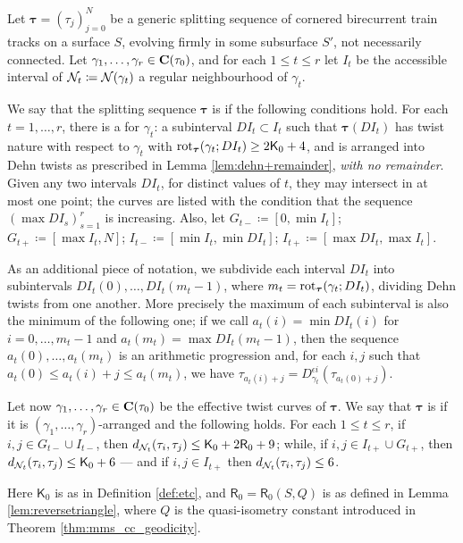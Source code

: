 \begin{defin}\label{def:arranged}
Let $\bm\tau=(\tau_j)_{j=0}^N$ be a generic splitting sequence of cornered birecurrent train tracks on a surface $S$, evolving firmly in some subsurface $S'$, not necessarily connected. Let $\gamma_1,\ldots,\gamma_r\in\mathbf C(\tau_0)$, and for each $1\leq t \leq r$ let $I_t$ be the accessible interval of ${\mathcal N}_t\coloneqq {\mathcal N}(\gamma_t)$ a regular neighbourhood of $\gamma_t$.

We say that the splitting sequence $\bm\tau$ is  if the following conditions hold. For each $t=1,\ldots,r$, there is a  for $\gamma_t$: a subinterval $DI_t\subset I_t$ such that $\bm\tau(DI_t)$ has twist nature with respect to $\gamma_t$ with $\mathrm{rot}_{\bm\tau}(\gamma_t;DI_t)\geq 2\mathsf{K}_0+4$, and is arranged into Dehn twists as prescribed in Lemma \ref{lem:dehn+remainder}, \emph{with no remainder}. Given any two intervals $DI_t$, for distinct values of $t$, they may intersect in at most one point; the curves are listed with the condition that the sequence $(\max DI_s)_{s=1}^r$ is increasing. Also, let $G_{t-}\coloneqq[0,\min I_t]$; $G_{t+}\coloneqq[\max I_t,N]$; $I_{t-}\coloneqq[\min I_t,\min DI_t]$; $I_{t+}\coloneqq [\max DI_t,\max I_t]$.

As an additional piece of notation, we subdivide each interval $DI_t$ into subintervals $DI_t(0), \ldots, DI_t(m_t-1)$, where $m_t=\mathrm{rot}_{\bm\tau}(\gamma_t;DI_t)$, dividing Dehn twists from one another. More precisely the maximum of each subinterval is also the minimum of the following one; if we call $a_t(i)=\min DI_t(i)$ for $i=0,\ldots,m_t-1$ and $a_t(m_t)=\max DI_t(m_t-1)$, then the sequence $a_t(0),\ldots,a_t(m_t)$ is an arithmetic progression and, for each $i,j$ such that $a_t(0) \leq a_t(i) +j \leq a_t(m_t)$, we have $\tau_{a_t(i)+j}=D_{\gamma_t}^{\epsilon i}\left(\tau_{a_t(0)+j}\right)$.

Let now $\gamma_1,\ldots,\gamma_r\in\mathbf C(\tau_0)$ be the effective twist curves of $\bm\tau$. We say that $\bm\tau$ is  if it is $(\gamma_1,\ldots,\gamma_r)$-arranged and the following holds. For each $1\leq t \leq r$, if $i,j\in G_{t-}\cup I_{t-}$, then $d_{{\mathcal N}_t}(\tau_i,\tau_j)\leq \mathsf{K}_0+2\mathsf{R}_0+9$; while, if $i,j\in I_{t+}\cup G_{t+}$, then $d_{{\mathcal N}_t}(\tau_i,\tau_j)\leq \mathsf{K}_0+6$ --- and if $i,j\in I_{t+}$ then $d_{{\mathcal N}_t}(\tau_i,\tau_j)\leq 6$. %

Here $\mathsf{K}_0$ is as in Definition \ref{def:etc}, and $\mathsf{R}_0=\mathsf{R}_0(S,Q)$ is as defined in Lemma \ref{lem:reversetriangle}, where $Q$ is the quasi-isometry constant introduced in Theorem \ref{thm:mms_cc_geodicity}.
\end{defin}

